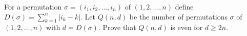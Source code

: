 \documentclass{article}
\begin{document}
\setlength{\parindent}{0pt}
For a permutation $\sigma=(i_{1},i_{2},\dots,i_{n})$ of $(1,2,\dots,n)$ define $D(\sigma)=\sum_{k=1}^{n}|i_k-k|$. Let $Q(n,d)$ be the number of permutations $\sigma$ of $(1,2,\dots,n)$ with $d=D(\sigma)$. Prove that $Q(n,d)$ is even for $d\ge2n$.
\end{document}
